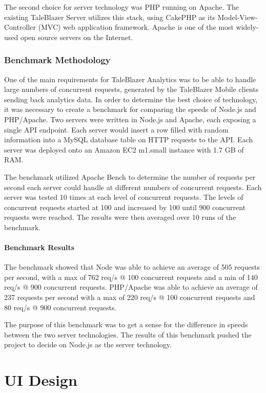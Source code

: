 The second choice for server technology was PHP running on Apache. The existing TaleBlazer Server utilizes this stack, using CakePHP as its Model-View-Controller (MVC) web application framework. Apache is one of the most widely-used open source servers on the Internet.

\subsubsection{Benchmark Methodology}

One of the main requirements for TaleBlazer Analytics was to be able to handle large numbers of concurrent requests, generated by the TaleBlazer Mobile clients sending back analytics data. In order to determine the best choice of technology, it was necessary to create a benchmark for comparing the speeds of Node.js and PHP/Apache. Two servers were written in Node.js and Apache, each exposing a single API endpoint. Each server would insert a row filled with random information into a MySQL database table on HTTP requests to the API. 
Each server was deployed onto an Amazon EC2 m1.small instance with 1.7 GB of RAM. 

The benchmark utilized Apache Bench to determine the number of requests per second each server could handle at different numbers of concurrent requests. Each server was tested 10 times at each level of concurrent requests. The levels of concurrent requests started at 100 and increased by 100 until 900 concurrent requests were reached. The results were then averaged over 10 runs of the benchmark.

\paragraph{Benchmark Results}

The benchmark showed that Node was able to achieve an average of 505 requests per second, with a max of 762 req/s @ 100 concurrent requests and a min of 140 req/s @ 900 concurrent requests. PHP/Apache was able to achieve an average of 237 requests per second with a max of 220 req/s @ 100 concurrent requests and 80 req/s @ 900 concurrent requests. 

The purpose of this benchmark was to get a sense for the difference in speeds between the two server technologies. The results of this benchmark pushed the project to decide on Node.js as the server technology.

\section{UI Design}


